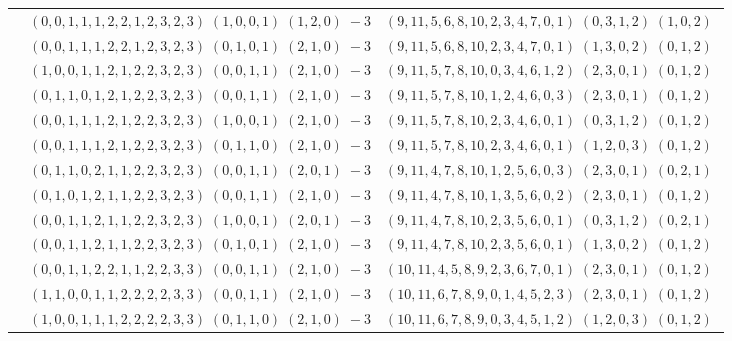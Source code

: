 \documentclass[11pt]{article}
\begin{document}
\begin{longtable}[l]{|c|c|c|}
 \cline{2-3} 
 & $(0 ,0 ,1 ,1 ,1 ,2 ,2 ,1 ,2 ,3 ,2 ,3) \;(1 ,0 ,0 ,1) \;(1 ,2 ,0) \;-3$ & $(9 ,11 ,5 ,6 ,8 ,10 ,2 ,3 ,4 ,7 ,0 ,1) \;(0 ,3 ,1 ,2) \;(1 ,0 ,2) \;$\\ 
 \cline{2-3} 
 & $(0 ,0 ,1 ,1 ,1 ,2 ,2 ,1 ,2 ,3 ,2 ,3) \;(0 ,1 ,0 ,1) \;(2 ,1 ,0) \;-3$ & $(9 ,11 ,5 ,6 ,8 ,10 ,2 ,3 ,4 ,7 ,0 ,1) \;(1 ,3 ,0 ,2) \;(0 ,1 ,2) \;$\\ 
 \cline{2-3} 
 & $(1 ,0 ,0 ,1 ,1 ,2 ,1 ,2 ,2 ,3 ,2 ,3) \;(0 ,0 ,1 ,1) \;(2 ,1 ,0) \;-3$ & $(9 ,11 ,5 ,7 ,8 ,10 ,0 ,3 ,4 ,6 ,1 ,2) \;(2 ,3 ,0 ,1) \;(0 ,1 ,2) \;$\\ 
 \cline{2-3} 
 & $(0 ,1 ,1 ,0 ,1 ,2 ,1 ,2 ,2 ,3 ,2 ,3) \;(0 ,0 ,1 ,1) \;(2 ,1 ,0) \;-3$ & $(9 ,11 ,5 ,7 ,8 ,10 ,1 ,2 ,4 ,6 ,0 ,3) \;(2 ,3 ,0 ,1) \;(0 ,1 ,2) \;$\\ 
 \cline{2-3} 
 & $(0 ,0 ,1 ,1 ,1 ,2 ,1 ,2 ,2 ,3 ,2 ,3) \;(1 ,0 ,0 ,1) \;(2 ,1 ,0) \;-3$ & $(9 ,11 ,5 ,7 ,8 ,10 ,2 ,3 ,4 ,6 ,0 ,1) \;(0 ,3 ,1 ,2) \;(0 ,1 ,2) \;$\\ 
 \cline{2-3} 
 & $(0 ,0 ,1 ,1 ,1 ,2 ,1 ,2 ,2 ,3 ,2 ,3) \;(0 ,1 ,1 ,0) \;(2 ,1 ,0) \;-3$ & $(9 ,11 ,5 ,7 ,8 ,10 ,2 ,3 ,4 ,6 ,0 ,1) \;(1 ,2 ,0 ,3) \;(0 ,1 ,2) \;$\\ 
 \cline{2-3} 
 & $(0 ,1 ,1 ,0 ,2 ,1 ,1 ,2 ,2 ,3 ,2 ,3) \;(0 ,0 ,1 ,1) \;(2 ,0 ,1) \;-3$ & $(9 ,11 ,4 ,7 ,8 ,10 ,1 ,2 ,5 ,6 ,0 ,3) \;(2 ,3 ,0 ,1) \;(0 ,2 ,1) \;$\\ 
 \cline{2-3} 
 & $(0 ,1 ,0 ,1 ,2 ,1 ,1 ,2 ,2 ,3 ,2 ,3) \;(0 ,0 ,1 ,1) \;(2 ,1 ,0) \;-3$ & $(9 ,11 ,4 ,7 ,8 ,10 ,1 ,3 ,5 ,6 ,0 ,2) \;(2 ,3 ,0 ,1) \;(0 ,1 ,2) \;$\\ 
 \cline{2-3} 
 & $(0 ,0 ,1 ,1 ,2 ,1 ,1 ,2 ,2 ,3 ,2 ,3) \;(1 ,0 ,0 ,1) \;(2 ,0 ,1) \;-3$ & $(9 ,11 ,4 ,7 ,8 ,10 ,2 ,3 ,5 ,6 ,0 ,1) \;(0 ,3 ,1 ,2) \;(0 ,2 ,1) \;$\\ 
 \cline{2-3} 
 & $(0 ,0 ,1 ,1 ,2 ,1 ,1 ,2 ,2 ,3 ,2 ,3) \;(0 ,1 ,0 ,1) \;(2 ,1 ,0) \;-3$ & $(9 ,11 ,4 ,7 ,8 ,10 ,2 ,3 ,5 ,6 ,0 ,1) \;(1 ,3 ,0 ,2) \;(0 ,1 ,2) \;$\\ 
 \cline{2-3} 
 & $(0 ,0 ,1 ,1 ,2 ,2 ,1 ,1 ,2 ,2 ,3 ,3) \;(0 ,0 ,1 ,1) \;(2 ,1 ,0) \;-3$ & $(10 ,11 ,4 ,5 ,8 ,9 ,2 ,3 ,6 ,7 ,0 ,1) \;(2 ,3 ,0 ,1) \;(0 ,1 ,2) \;$\\ 
 \cline{2-3} 
 & $(1 ,1 ,0 ,0 ,1 ,1 ,2 ,2 ,2 ,2 ,3 ,3) \;(0 ,0 ,1 ,1) \;(2 ,1 ,0) \;-3$ & $(10 ,11 ,6 ,7 ,8 ,9 ,0 ,1 ,4 ,5 ,2 ,3) \;(2 ,3 ,0 ,1) \;(0 ,1 ,2) \;$\\ 
 \cline{2-3} 
 & $(1 ,0 ,0 ,1 ,1 ,1 ,2 ,2 ,2 ,2 ,3 ,3) \;(0 ,1 ,1 ,0) \;(2 ,1 ,0) \;-3$ & $(10 ,11 ,6 ,7 ,8 ,9 ,0 ,3 ,4 ,5 ,1 ,2) \;(1 ,2 ,0 ,3) \;(0 ,1 ,2) \;$\\ 

\end{longtable}
\end{document}
